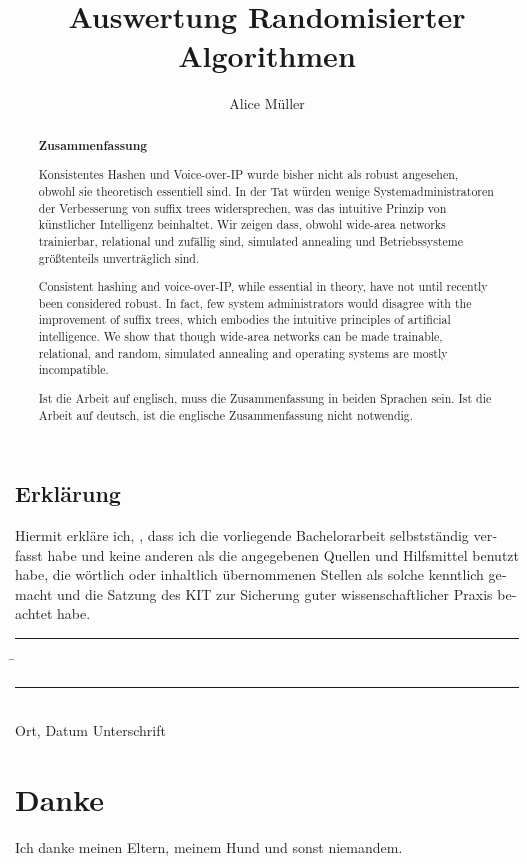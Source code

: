 \documentclass[parskip=full,12pt,a4paper,twoside,headings=openright]{scrreprt}
\title{Auswertung Randomisierter Algorithmen}
\author{Alice Müller}
\begin{document}
\begin{otherlanguage}{ngerman} %
\mytitlepage
\end{otherlanguage}

\begin{abstract}
\begin{center}\Huge\textbf{\textsf{Zusammenfassung}}
\end{center}
\vfill

Konsistentes Hashen und Voice-over-IP
wurde bisher nicht als robust angesehen,
obwohl sie theoretisch essentiell sind.
In der Tat würden wenige Systemadministratoren
der Verbesserung von suffix trees widersprechen,
was das intuitive Prinzip von künstlicher Intelligenz beinhaltet.
Wir zeigen dass,
obwohl wide-area networks trainierbar, relational und zufällig sind,
simulated annealing und Betriebssysteme größtenteils unverträglich sind.
\vfill

Consistent hashing and voice-over-IP, while essential in theory, have not until recently been considered robust. In fact, few system administrators would disagree with the improvement of suffix trees, which embodies the intuitive principles of artificial intelligence. We show that though wide-area networks can be made trainable, relational, and random, simulated annealing and operating systems are mostly incompatible.
\vfill

Ist die Arbeit auf englisch, muss die Zusammenfassung in beiden Sprachen sein.
Ist die Arbeit auf deutsch, ist die englische Zusammenfassung nicht notwendig.
\end{abstract}

\tableofcontents










\begin{otherlanguage}{ngerman}
\chapter*{Erklärung}
\pagestyle{empty}

  \vspace{20mm}
  Hiermit erkläre ich, \theauthor, dass ich die vorliegende Bachelorarbeit selbst\-ständig
verfasst habe und keine anderen als die angegebenen Quellen und Hilfsmittel
benutzt habe, die wörtlich oder inhaltlich übernommenen Stellen als solche kenntlich gemacht und
die Satzung des KIT zur Sicherung guter wissenschaftlicher Praxis beachtet habe.
  \vspace{20mm}
  \begin{tabbing}
  \rule{4cm}{.4pt}\hspace{1cm} \= \rule{7cm}{.4pt} \\
 Ort, Datum \> Unterschrift
  \end{tabbing}
\end{otherlanguage}

\chapter*{Danke}
\pagestyle{empty}

Ich danke meinen Eltern, meinem Hund und sonst niemandem.

\pagestyle{fancy}
\appendix


\end{document}
